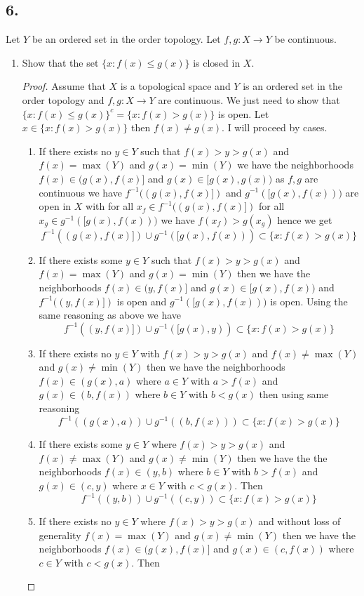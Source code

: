 \documentclass{amsart}
\theoremstyle{plain}
\theoremstyle{definition}
\theoremstyle{remark}
\begin{document}
\subsection*{6.} Let $Y$ be an ordered set in the order topology. Let $f,g:X\to Y$ be continuous.
\begin{enumerate}
    \item Show that the set $\{x: f(x)\leq g(x)\}$ is closed in $X$.
    \begin{proof}
        Assume that $X$ is a topological space and $Y$ is an ordered set in the order topology and $f,g:X\to Y$ are continuous. We just need to show that $\{x: f(x)\leq g(x)\}^c=\{x: f(x)> g(x)\}$ is open. Let $x\in \{x: f(x)> g(x)\}$ then $f(x)\not = g(x)$. I will proceed by cases. \begin{enumerate}
            \item If there exists no $y\in Y$ such that $f(x)>y>g(x)$ and $f(x)=\max(Y)$ and $g(x)=\min(Y)$ we have the neighborhoods $f(x)\in (g(x),f(x)]$ and $g(x)\in [g(x),g(x))$ as $f,g$ are continuous we have $f^{-1}((g(x),f(x)])$ and $g^{-1}([g(x),f(x)))$ are open in $X$ with for all $x_f\in  f^{-1}((g(x),f(x)])$ for all $x_g\in g^{-1}([g(x),f(x)))$ we have $f(x_f)>g(x_g)$ hence we get \[f^{-1}((g(x),f(x)])\cup g^{-1}([g(x),f(x))) \subset \{x: f(x)>g(x)\}\]
            \item If there exists some $y\in Y$ such that $f(x)>y>g(x)$ and $f(x)=\max(Y)$ and $g(x)=\min (Y)$ then we have the neighborhoods $f(x)\in (y,f(x)]$ and $g(x)\in [g(x),f(x))$ and $f^{-1}((y,f(x)])$ is open and $g^{-1}([g(x),f(x)))$ is open. Using the same reasoning as above we have 
            \[
                f^{-1}((y,f(x)])\cup g^{-1}([g(x),y)) \subset \{x: f(x)>g(x)\}
            \]
            \item If there exists no $y\in Y$ with $f(x)>y > g(x)$ and $f(x)\not = \max (Y)$ and $g(x)\not = \min (Y)$ then we have the neighborhoods $f(x)\in (g(x),a)$ where $a\in Y$ with $a> f(x)$ and $g(x)\in (b,f(x))$ where $b\in Y$ with $b< g(x)$ then using same reasoning \[ f^{-1}((g(x),a))\cup g^{-1}((b,f(x))) \subset \{x: f(x)>g(x)\}\]
            \item If there exists some $y\in Y$ where $f(x)>y>g(x)$ and $f(x)\not =\max(Y)$ and $g(x)\not =\min(Y)$ then we have the the neighborhoods $f(x)\in (y,b)$ where $b\in Y$ with $b>f(x)$ and $g(x)\in (c,y)$ where $x\in Y$ with $c<g(x)$. Then 
            \[
                f^{-1}((y,b))\cup g^{-1}((c,y))\subset \{x:f(x)> g(x)\}
            \]
            \item If there exists no $y\in Y$ where $f(x)>y>g(x)$ and without loss of generality $f(x)=\max(Y)$ and $g(x)\not = \min (Y)$ then we have the neighborhoods $f(x)\in (g(x),f(x)]$ and $g(x)\in (c,f(x))$ where $c\in Y$ with $c<g(x)$. Then 

\end{enumerate}
\end{proof}
\end{enumerate}
\end{document}
